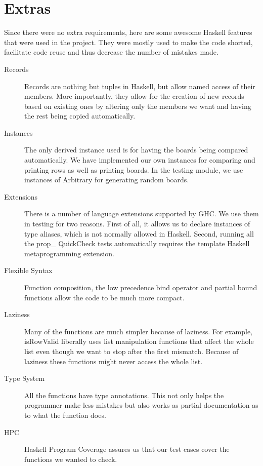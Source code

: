 \documentclass[11pt, a4paper]{scrartcl}
\begin{document}
\section{Extras}

Since there were no extra requirements, here are some awesome Haskell features
that were used in the project. They were mostly used to make the code shorted,
facilitate code reuse and thus decrease the number of mistakes made.

\begin{description}
    \item[Records] Records are nothing but tuples in Haskell, but allow named
        access of their members. More importantly, they allow for the creation
        of new records based on existing ones by altering only the members we
        want and having the rest being copied automatically.
    \item[Instances] The only derived instance used is for having the boards
        being compared automatically. We have implemented our own instances for
        comparing and printing rows as well as printing boards. In the testing
        module, we use instances of Arbitrary for generating random boards.
    \item[Extensions] There is a number of language extensions supported by GHC.
        We use them in testing for two reasons. First of all, it allows us to
        declare instances of type aliases, which is not normally allowed in
        Haskell. Second, running all the prop\_ QuickCheck tests automatically
        requires the template Haskell metaprogramming extension.
    \item[Flexible Syntax] Function composition, the low precedence bind
        operator and partial bound functions allow the code to be much more
        compact.
    \item[Laziness] Many of the functions are much simpler because of laziness.
        For example, isRowValid liberally uses list manipulation functions
        that affect the whole list even though we want to stop after the first
        mismatch. Because of laziness these functions might never access the
        whole list.
    \item[Type System] All the functions have type annotations. This not only
        helps the programmer make less mistakes but also works as partial
        documentation as to what the function does.
    \item[HPC] Haskell Program Coverage assures us that our test cases
        cover the functions we wanted to check.
\end{description}
\end{document}
